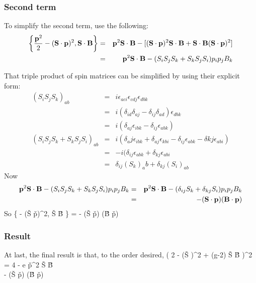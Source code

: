 \subsubsection*{Second term}
To simplify the second term, use the following:
\begin{eqnarray*}
\left \{ \frac{\mathbf{p}^2}{2} - (\mathbf{S} \cdot \mathbf{p})^2, \mathbf{S} \cdot \mathbf{B} \right \}
	&=&	 \mathbf{p}^2 \mathbf{S} \cdot \mathbf{B} - [(\mathbf{S} \cdot \mathbf{p})^2 \mathbf{S} \cdot \mathbf{B} + \mathbf{S} \cdot \mathbf{B} (\mathbf{S} \cdot \mathbf{p})^2  ]	\\
	&=&	 \mathbf{p}^2 \mathbf{S} \cdot \mathbf{B} - (S_i S_j S_k + S_k S_j S_i) p_i p_j B_k
\end{eqnarray*}

That triple product of spin matrices can be simplified by using their explicit form:
\begin{eqnarray*}
	(S_i S_j S_k )_{ab}
		&=&	i\epsilon_{aci}\epsilon_{cdj}\epsilon_{dbk}	\\
		&=&	i(\delta_{id} \delta_{aj} - \delta_{ij} \delta_{ad})\epsilon_{dbk}	\\
		&=&	i(\delta_{aj} \epsilon_{ibk} - \delta_{ij} \epsilon_{abk})		\\
	(S_i S_j S_k + S_k S_j S_i)_{ab}
		&=& i(\delta_aj \epsilon_{ibk} + \delta_{aj} \epsilon_{kbi} -\delta_{ij} \epsilon_{abk} -\delta{kj}\epsilon_{abi})	\\
		&=& -i(\delta_{ij} \epsilon_{abk} + \delta_{kj} \epsilon_{abi}	\\
		&=&	\delta_{ij} {(S_k)}_ab + \delta_{kj} {(S_i)}_{ab}	
\end{eqnarray*}
Now 
\begin{eqnarray*}
 \mathbf{p}^2 \mathbf{S} \cdot \mathbf{B} - (S_i S_j S_k + S_k S_j S_i) p_i p_j B_k
 	&=& \mathbf{p}^2 \mathbf{S} \cdot \mathbf{B} - (\delta_{ij} S_k + \delta_{kj} S_i	) p_i p_j B_k	\\
 	&=& - (\mathbf{S} \cdot \mathbf{p}) (\mathbf{B} \cdot \mathbf{p})
\end{eqnarray*}
So
\beq \label{eq:A:SBanticom}
	\left \{  - (\v{S} \cdot \v{p})^2, \v{S} \cdot \v{B} \right \}
	 =
	 - (\v{S} \cdot \v{p}) (\v{B} \cdot \v{p})
\eeq

\subsubsection*{Result}
At last, the final result is that, to the order desired,
\beq \label{eq:A:crossterm}
	\left(   {2} -  (\v{S} \cdot \gv{\pi})^2 + (g-2) \v{S} \cdot \v{B} \right )^2 
	=	 {4}  -  e \v{p}^2  \v{S} \cdot \v{B} \\
		 - (\v{S} \cdot \v{p}) (\v{B} \cdot \v{p})
\eeq





